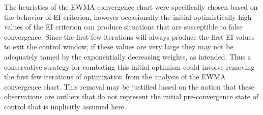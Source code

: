 \documentclass[12pt]{article}
\begin{document}
The heuristics of the EWMA convergence chart were specifically chosen based on the behavior of EI criterion, however occasionally the initial optimistically high values of the EI criterion can produce situations that are susceptible to false convergence.
%
Since the first few iterations will always produce the first EI values to exit the control window, if these values are very large they may not be adequately tamed by the exponentially decreasing weights, as intended. %
%
Thus a conservative strategy for \mbox{combating} this initial optimism could involve removing the first few iterations of optimization from the analysis of the EWMA convergence chart.
%
This removal may be justified based on the notion that these observations are outliers that do not represent the initial pre-convergence state of control that is implicitly assumed here. 



%

% 
\end{document}
